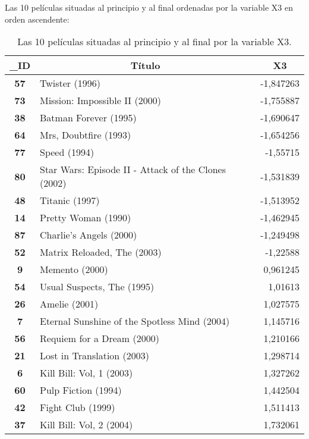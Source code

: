 \documentclass{uimppracticas}
\begin{document}
Las 10 películas situadas al principio y al final ordenadas por la variable X3 en orden ascendente:

\begin{table}[h]
	\centering
	\begin{tabular}{|c|l|r|}
		\hline
		\textbf{\_ID} & \multicolumn{1}{c|}{\textbf{Título}}                & \multicolumn{1}{c|}{\textbf{X3}} \\ \hline
		\textbf{57} & Twister (1996)                & -1,847263 \\ \hline
		\textbf{73} & Mission: Impossible II (2000) & -1,755887 \\ \hline
		\textbf{38} & Batman Forever (1995)         & -1,690647 \\ \hline
		\textbf{64} & Mrs, Doubtfire (1993)         & -1,654256 \\ \hline
		\textbf{77} & Speed (1994)                  & -1,55715  \\ \hline
		\textbf{80}   & Star Wars: Episode II - Attack of the Clones (2002) & -1,531839                        \\ \hline
		\textbf{48} & Titanic (1997)                & -1,513952 \\ \hline
		\textbf{14} & Pretty Woman (1990)           & -1,462945 \\ \hline
		\textbf{87} & Charlie's Angels (2000)       & -1,249498 \\ \hline
		\textbf{52} & Matrix Reloaded, The (2003)   & -1,22588  \\ \hline
		\hline
		\textbf{9}  & Memento (2000)             & 0,961245 \\ \hline
		\textbf{54} & Usual Suspects, The (1995) & 1,01613  \\ \hline
		\textbf{26} & Amelie (2001)              & 1,027575 \\ \hline
		\textbf{7}    & Eternal Sunshine of the Spotless Mind (2004) & 1,145716                         \\ \hline
		\textbf{56} & Requiem for a Dream (2000) & 1,210166 \\ \hline
		\textbf{21} & Lost in Translation (2003) & 1,298714 \\ \hline
		\textbf{6}  & Kill Bill: Vol, 1 (2003)   & 1,327262 \\ \hline
		\textbf{60} & Pulp Fiction (1994)        & 1,442504 \\ \hline
		\textbf{42} & Fight Club (1999)          & 1,511413 \\ \hline
		\textbf{37} & Kill Bill: Vol, 2 (2004)   & 1,732061 \\ \hline
	\end{tabular}
	\caption{Las 10 películas situadas al principio y al final por la variable X3.}
	\label{X3_principio}
\end{table}
\end{document}
